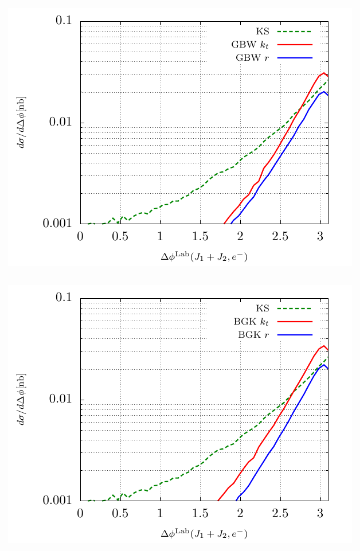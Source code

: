 \documentclass[12pt]{article}
\numberwithin{equation}{section}
\numberwithin{table}{section}
\numberwithin{figure}{section}
\begin{document}
\begin{figure}[p]
	\begin{subfigure}{0.5\textwidth}
		\includegraphics[width=\textwidth]{plots/plotGBW1Lab} 
	\end{subfigure}
	\begin{subfigure}{0.5\textwidth}
		\includegraphics[width=\textwidth]{plots/plotBGK1Lab} 
	\end{subfigure}


\end{figure}
\end{document}
